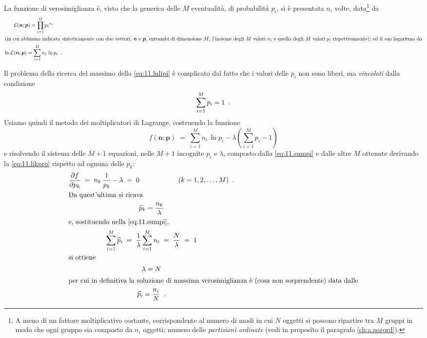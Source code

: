 La funzione di verosimiglianza \`e, visto che la generica
delle $M$ eventualit\`a, di probabilit\`a $p_i$, si \`e
presentata $n_i$ volte, data\/\footnote{A meno di un fattore
  moltiplicativo costante, corrispondente al numero di modi
  in cui $N$ oggetti si possono ripartire tra $M$ gruppi in
  modo che ogni gruppo sia composto da $n_i$ oggetti; numero
  delle \emph{partizioni ordinate}%
  (vedi in proposito il paragrafo \ref{ch:a.parord}).
} da
\begin{gather}
  \mathcal{L} ( \boldsymbol{n}; \boldsymbol{p} ) =
    \prod_{i=1}^M {p_i}^{n_i} \notag \\
  \intertext{(in cui abbiamo indicato sinteticamente con
    due vettori, $\boldsymbol{n}$ e $\boldsymbol{p}$,
    entrambi di dimensione $M$, l'insieme degli
    $M$ valori $n_i$ e quello degli $M$ valori $p_i$
    rispettivamente); ed il suo logaritmo da}
  \ln \mathcal{L} ( \boldsymbol{n}; \boldsymbol{p} ) =
    \sum_{i=1}^M n_i \, \ln p_i \;\; . \label{eq:11.lnlipi}
\end{gather}

Il problema della ricerca del massimo della
\eqref{eq:11.lnlipi} \`e complicato dal fatto che i valori
delle $p_i$ non sono liberi, ma \emph{vincolati} dalla
condizione
\begin{equation} \label{eq:11.sumpi}
  \sum_{i=1}^M p_i = 1 \;\; .
\end{equation}
Usiamo quindi il metodo dei moltiplicatori di Lagrange,
costruendo la funzione
\begin{equation} \label{eq:11.likpro}
  f( \boldsymbol{n}; \boldsymbol{p} ) \; = \; \sum_{i=1}^M
    n_i \, \ln p_i - \lambda \left( \sum_{i=1}^M p_i - 1
    \right)
\end{equation}
e risolvendo il sistema delle $M+1$ equazioni, nelle $M+1$
incognite $p_i$ e $\lambda$, composto dalla
\eqref{eq:11.sumpi} e dalle altre $M$ ottenute derivando la
\eqref{eq:11.likpro} rispetto ad ognuna delle $p_k$:
\begin{gather*}
  \frac{\partial f}{\partial p_k} \; = \; n_k \,
    \frac{1}{p_k} - \lambda \; = \; 0 \hspace{2cm} (k = 1,
    2,\ldots, M) \peq . \\
  \intertext{Da quest'ultima si ricava}
  \widehat p_k = \frac{n_k}{\lambda} \\
  \intertext{e, sostituendo nella \eqref{eq:11.sumpi},}
  \sum_{i=1}^M \widehat p_i \; = \; \frac{1}{\lambda}
    \sum_{i=1}^M n_i \; = \; \frac{N}{\lambda} \; = \; 1
    \\
  \intertext{si ottiene}
  \lambda = N \\
  \intertext{per cui in definitiva la soluzione di massima
    verosimiglianza \`e (cosa non sorprendente) data dalle}
  \widehat p_i = \frac{n_i}{N} \peq .
\end{gather*}

